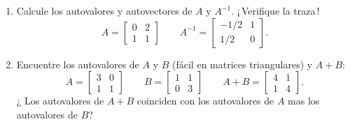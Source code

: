 \begin{enumerate}
¿Qué es $Q^{-1}$ y cuáles son sus autovalores\,?
\item Calcule los autovalores y autovectores de $A$ y   $A^{-1}$. ¡\,Verifique la traza\,!
%
\[
A=\begin{bmatrix}
                 0 & 2 \\
                 1 & 1 \end{bmatrix} \qquad
A^{-1}=
\begin{bmatrix}
            -1/2  & 1 \\
             1/2  & 0\end{bmatrix}.
\]
%

\item Encuentre los autovalores de $A$ y $B$ (fácil en matrices triangulares) y $A+B$:
$$
A=\begin{bmatrix} 3&0\\ 1&1\end{bmatrix}\qquad
B=
\begin{bmatrix} 1&1\\ 0&3\end{bmatrix}
\qquad
A+B=\begin{bmatrix} 4&1\\ 1&4\end{bmatrix}.
$$
¿ Los autovalores de $A+B$ coinciden con los autovalores de $A$ mas los autovalores de $B$?


\end{enumerate}
